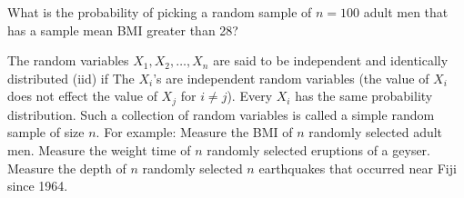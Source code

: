 \ii What is the probability of picking a random sample of $n=100$ adult men that has a sample mean BMI greater than 28? \vfill
\ee
\ee

\clearpage


\bbox
The random variables $X_1, X_2, \ldots , X_n$ are said to be \alert{independent and identically distributed (iid)} if
\bi
\ii The $X_i$'s are independent random variables (the value of $X_i$ does not effect the value of $X_j$ for $i \ne j$).
\ii Every $X_i$ has the same probability distribution.
\ii Such a collection of random variables is called a \alert{simple random sample} of size $n$.
\ei
For example:
\bi
\ii Measure the BMI of $n$ randomly selected adult men.
\ii Measure the weight time of $n$ randomly selected eruptions of a geyser.
\ii Measure the depth of $n$ randomly selected $n$ earthquakes that occurred near Fiji since 1964.
\ei
\ebox

